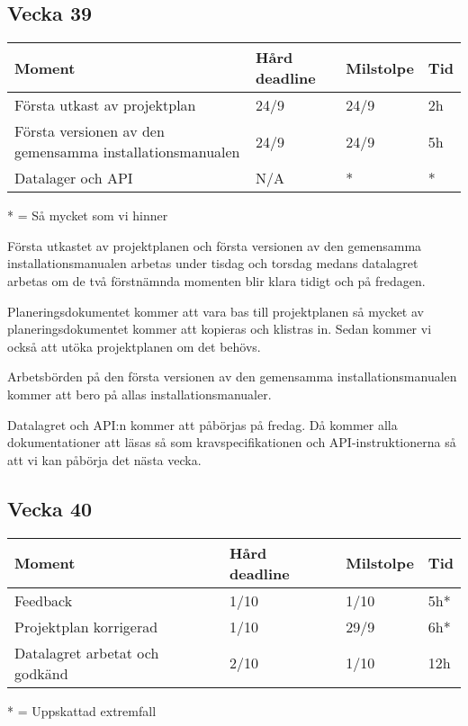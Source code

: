 \documentclass{TDP003mall}
\begin{document}
\subsection*{Vecka 39}
\begin{table}[!h]
\begin{tabularx}{\linewidth}{|X|l|l|l|}
\hline
Moment & Hård deadline & Milstolpe & Tid \\\hline
Första utkast av projektplan & 24/9 & 24/9 & 2h \\\hline
Första versionen av den gemensamma installationsmanualen & 24/9 & 24/9 & 5h \\\hline
Datalager och API & N/A & * & *\\\hline
\end{tabularx}
\end{table}
* = Så mycket som vi hinner

Första utkastet av projektplanen och första versionen av den gemensamma installationsmanualen arbetas under tisdag och torsdag medans datalagret arbetas om de två förstnämnda momenten blir klara tidigt och på fredagen.

Planeringsdokumentet kommer att vara bas till projektplanen så mycket av planeringsdokumentet kommer att kopieras och klistras in. Sedan kommer vi också att utöka projektplanen om det behövs.

Arbetsbörden på den första versionen av den gemensamma installationsmanualen kommer att bero på allas installationsmanualer.

Datalagret och API:n kommer att påbörjas på fredag. Då kommer alla dokumentationer att läsas så som kravspecifikationen och API-instruktionerna så att vi kan påbörja det nästa vecka.

\subsection*{Vecka 40}
\begin{table}[!h]
\begin{tabularx}{\linewidth}{|X|l|l|l|}
\hline
Moment & Hård deadline & Milstolpe & Tid \\\hline
Feedback & 1/10 & 1/10 & 5h* \\\hline
Projektplan korrigerad & 1/10 & 29/9 & 6h* \\\hline
Datalagret arbetat och godkänd & 2/10 & 1/10 & 12h\\\hline
\end{tabularx}
\end{table}
* = Uppskattad extremfall
\end{document}
